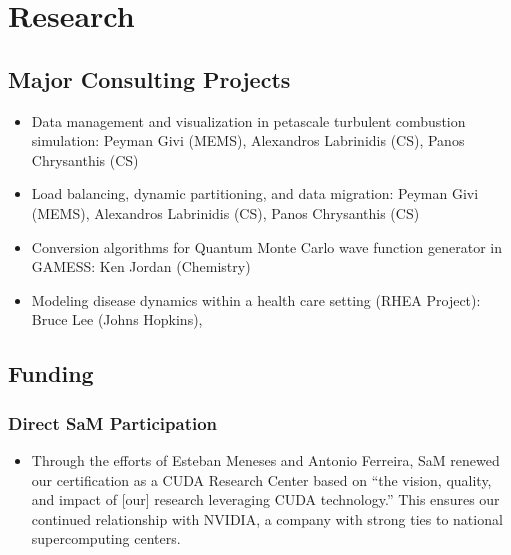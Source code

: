 \chapter{Research}

\section{Major Consulting Projects}
\begin{itemize}
   \item Data management and visualization in petascale turbulent
         combustion simulation: Peyman Givi (MEMS), Alexandros
         Labrinidis (CS), Panos Chrysanthis (CS)
   \item Load balancing, dynamic partitioning, and data migration: Peyman
         Givi (MEMS), Alexandros Labrinidis (CS), Panos Chrysanthis (CS)
   \item Conversion algorithms for Quantum Monte Carlo wave function
         generator in GAMESS: Ken Jordan (Chemistry)
   \item Modeling disease dynamics within a health care setting (RHEA
         Project): Bruce Lee (Johns Hopkins),
\end{itemize}

\section{Funding}
\subsection{Direct SaM Participation}
\begin{itemize}
   \item Through the efforts of Esteban Meneses and Antonio Ferreira,
         SaM renewed our certification as a CUDA Research Center based
         on ``the vision, quality, and impact of [our] research
         leveraging CUDA technology.''  This ensures our continued
         relationship with NVIDIA, a company with strong ties to
         national supercomputing centers.
\end{itemize}

